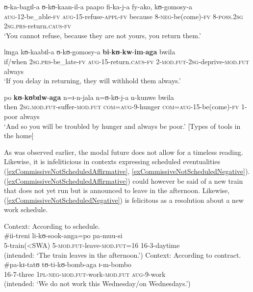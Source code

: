 \begin{exe}
\begin{xlist}
\ex \label{exCommissiveSequenceConsequenceSentence5}
\gll ʊ-ka-bagɪl-a ʊ-kʊ-kaan-il-a paapo fi-ka-j-a fy-ako, kʊ-gomosy-a\\
\textsc{aug}-12-be\_able-\textsc{fv} \textsc{aug}-15-refuse-\textsc{appl}-\textsc{fv} because 8-\textsc{neg}-be(come)-\textsc{fv} 8-\textsc{poss.2sg} \textsc{2sg.prs}-return.\textsc{caus}-\textsc{fv}\\
\glt \lq You cannot refuse, because they are not yours, you return them.'

\ex \label{exCommissiveSequenceConsequenceSentence6}
\gll lɪnga kʊ-kaabɪl-a ʊ-kʊ-gomosy-a \textbf{bi}-\textbf{kʊ}-\textbf{kw}-\textbf{im}-\textbf{aga} bwila\\
if/when \textsc{2sg.prs}-be\_late-\textsc{fv} \textsc{aug}-15-return.\textsc{caus}-\textsc{fv} 2-\textsc{mod.fut}-\textsc{2sg}-deprive-\textsc{mod.fut} always\\
\glt \lq If you delay in returning, they will withhold them always.'

\ex \label{exCommissiveSequenceConsequenceSentence7} \gll po \textbf{kʊ}-\textbf{kʊbɪlw}-\textbf{aga} n=ɪ-n-jala n=ʊ-kʊ-j-a n-kunwe bwila\\
then \textsc{2sg.mod.fut}-suffer-\textsc{mod.fut} \textsc{com}=\textsc{aug}-9-hunger \textsc{com}=\textsc{aug}-15-be(come)-\textsc{fv} 1-poor always\\
\glt \lq And so you will be troubled by hunger and always be poor.'
[Types of tools in the home]
\end{xlist}
\end{exe}

As was observed earlier, the modal future does not allow for a timeless reading. Likewise, it is infeliticious in contexts expressing scheduled eventualities (\ref{exCommissiveNotScheduledAffirmative}, \ref{exCommissiveNotScheduledNegative}). (\ref{exCommissiveNotScheduledAffirmative}) could however be said of a new train that does not yet run but is announced to leave in the afternoon. Likewise, (\ref{exCommissiveNotScheduledNegative}) is felicitous as a resolution about a new work schedule.

\begin{exe}
\ex\label{exCommissiveNotScheduledAffirmative}Context: According to schedule.\\
\gll \#ii-treni li-kʊ-sook-anga=po pa-muu-si\\
\phantom{\#}5-train(<SWA) 5-\textsc{mod.fut}-leave-\textsc{mod.fut}=16 16-3-daytime\\
\glt \makebox[\myl][l]{}(intended: \lq The train leaves in the afternoon.')
\ex\label{exCommissiveNotScheduledNegative}Context: According to contract.\\
\gll \#pa-kɪ-tatʊ tʊ-ti-kʊ-bomb-aga ɪ-m-bombo\\
\phantom{\#}16-7-three \textsc{1pl}-\textsc{neg}-\textsc{mod.fut}-work-\textsc{mod.fut} \textsc{aug}-9-work\\
\glt \makebox[\myl][l]{}(intended: \lq We do not work this Wednesday/on Wednesdays.')
\end{exe}


